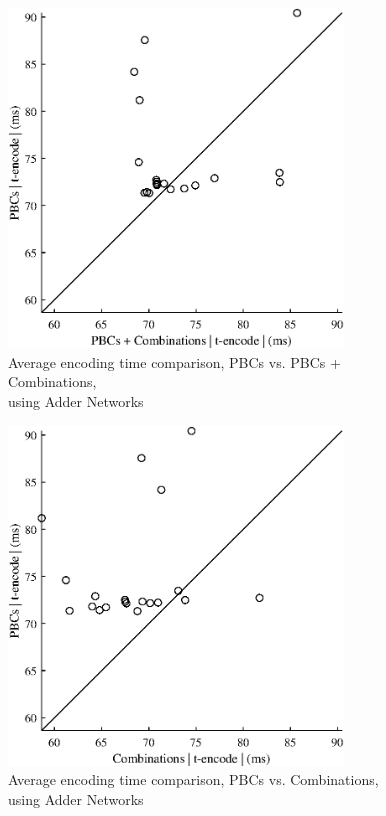 {
\renewcommand{\figurename}{Plot}
\begin{figure}
    \centering
    \includegraphics[height = 90mm]{Figures/opt_encode_2_1.eps}
    \captionsetup{justification=centering,margin=0cm}
    \caption{Average encoding time comparison, PBCs vs. PBCs + Combinations,\\ using Adder Networks}
    \label{opt_encode_2_1}
\end{figure}

\begin{figure}
    \centering
    \includegraphics[height = 90mm]{Figures/opt_encode_3_1.eps}
    \captionsetup{justification=centering,margin=0cm}
    \caption{Average encoding time comparison, PBCs vs. Combinations,\\ using Adder Networks}
    \label{opt_encode_3_1}
\end{figure}

}
